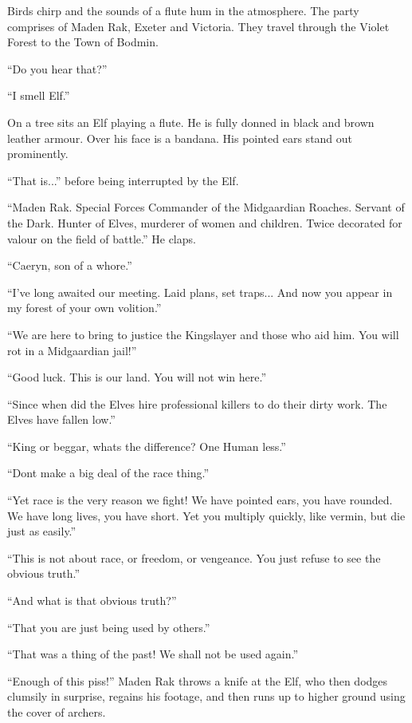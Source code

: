 \pagecolor{gray}\afterpage{\nopagecolor}
\selectfont
Birds chirp and the sounds of a flute hum in the atmosphere. The party comprises of Maden Rak, Exeter and Victoria. They travel through the Violet Forest to the Town of Bodmin. 

``Do you hear that?'' 

``I smell Elf.''

On a tree sits an Elf playing a flute. He is fully donned in black and brown leather armour. Over his face is a bandana. His pointed ears stand out prominently. 

``That is...'' before being interrupted by the Elf.

``Maden Rak. Special Forces Commander of the Midgaardian Roaches. Servant of the Dark. Hunter of Elves, murderer of women and children. Twice decorated for valour on the field of battle.'' He claps.

``Caeryn, son of a whore.''

``I've long awaited our meeting. Laid plans, set traps... And now you appear in my forest of your own volition.''

``We are here to bring to justice the Kingslayer and those who aid him. You will rot in a Midgaardian jail!''

``Good luck. This is our land. You will not win here.''

``Since when did the Elves hire professional killers to do their dirty work. The Elves have fallen low.''

``King or beggar, whats the difference? One Human less.''

``Dont make a big deal of the race thing.''

``Yet race is the very reason we fight! We have pointed ears, you have rounded. We have long lives, you have short. Yet you multiply quickly, like vermin, but die just as easily.''

``This is not about race, or freedom, or vengeance. You just refuse to see the obvious truth.''

``And what is that obvious truth?''

``That you are just being used by others.''

``That was a thing of the past! We shall not be used again.''

``Enough of this piss!'' Maden Rak throws a knife at the Elf, who then dodges clumsily in surprise, regains his footage, and then runs up to higher ground using the cover of archers. 
\normalfont
